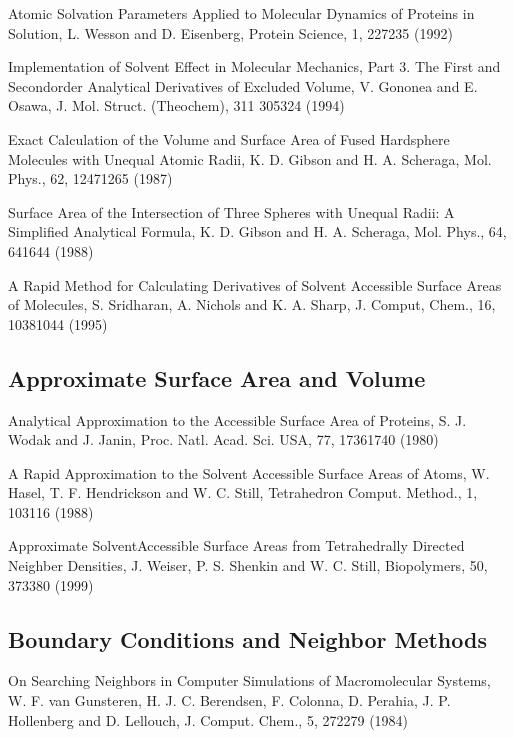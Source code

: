 \documentclass[letterpaper,11pt,english]{sphinxmanual}
\begin{document}
Atomic Solvation Parameters Applied to Molecular Dynamics of Proteins in Solution, L. Wesson and D. Eisenberg, Protein Science, 1, 227\sphinxhyphen{}235 (1992)

Implementation of Solvent Effect in Molecular Mechanics, Part 3. The First\sphinxhyphen{} and Second\sphinxhyphen{}order Analytical Derivatives of Excluded Volume, V. Gononea and E. Osawa, J. Mol. Struct. (Theochem), 311 305\sphinxhyphen{}324 (1994)

Exact Calculation of the Volume and Surface Area of Fused Hard\sphinxhyphen{}sphere Molecules with Unequal Atomic Radii, K. D. Gibson and H. A. Scheraga, Mol. Phys., 62, 1247\sphinxhyphen{}1265 (1987)

Surface Area of the Intersection of Three Spheres with Unequal Radii: A Simplified Analytical Formula, K. D. Gibson and H. A. Scheraga, Mol. Phys., 64, 641\sphinxhyphen{}644 (1988)

A Rapid Method for Calculating Derivatives of Solvent Accessible Surface Areas of Molecules, S. Sridharan, A. Nichols and K. A. Sharp, J. Comput, Chem., 16, 1038\sphinxhyphen{}1044 (1995)


\subsection{Approximate Surface Area and Volume}
\label{\detokenize{text/references:approximate-surface-area-and-volume}}
Analytical Approximation to the Accessible Surface Area of Proteins, S. J. Wodak and J. Janin, Proc. Natl. Acad. Sci. USA, 77, 1736\sphinxhyphen{}1740 (1980)

A Rapid Approximation to the Solvent Accessible Surface Areas of Atoms, W. Hasel, T. F. Hendrickson and W. C. Still, Tetrahedron Comput. Method., 1, 103\sphinxhyphen{}116 (1988)

Approximate Solvent\sphinxhyphen{}Accessible Surface Areas from Tetrahedrally Directed Neighber Densities, J. Weiser, P. S. Shenkin and W. C. Still, Biopolymers, 50, 373\sphinxhyphen{}380 (1999)


\subsection{Boundary Conditions and Neighbor Methods}
\label{\detokenize{text/references:boundary-conditions-and-neighbor-methods}}
On Searching Neighbors in Computer Simulations of Macromolecular Systems, W. F. van Gunsteren, H. J. C. Berendsen, F. Colonna, D. Perahia, J. P. Hollenberg and D. Lellouch, J. Comput. Chem., 5, 272\sphinxhyphen{}279  (1984)
\end{document}
